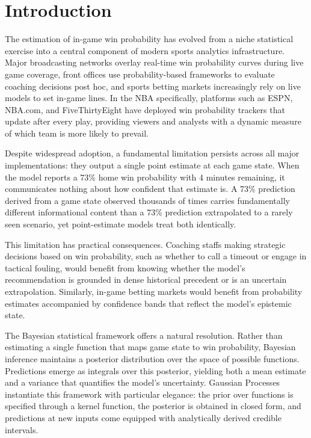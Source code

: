 \documentclass[conference]{IEEEtran}
\begin{document}
\section{Introduction}

The estimation of in-game win probability has evolved from a niche statistical exercise into a central component of modern sports analytics infrastructure. Major broadcasting networks overlay real-time win probability curves during live game coverage, front offices use probability-based frameworks to evaluate coaching decisions post hoc, and sports betting markets increasingly rely on live models to set in-game lines. In the NBA specifically, platforms such as ESPN, NBA.com, and FiveThirtyEight have deployed win probability trackers that update after every play, providing viewers and analysts with a dynamic measure of which team is more likely to prevail.

Despite widespread adoption, a fundamental limitation persists across all major implementations: they output a single point estimate at each game state. When the model reports a 73\% home win probability with 4 minutes remaining, it communicates nothing about how confident that estimate is. A 73\% prediction derived from a game state observed thousands of times carries fundamentally different informational content than a 73\% prediction extrapolated to a rarely seen scenario, yet point-estimate models treat both identically.

This limitation has practical consequences. Coaching staffs making strategic decisions based on win probability, such as whether to call a timeout or engage in tactical fouling, would benefit from knowing whether the model's recommendation is grounded in dense historical precedent or is an uncertain extrapolation. Similarly, in-game betting markets would benefit from probability estimates accompanied by confidence bands that reflect the model's epistemic state.

The Bayesian statistical framework offers a natural resolution. Rather than estimating a single function that maps game state to win probability, Bayesian inference maintains a posterior distribution over the space of possible functions. Predictions emerge as integrals over this posterior, yielding both a mean estimate and a variance that quantifies the model's uncertainty. Gaussian Processes \cite{rasmussen2006} instantiate this framework with particular elegance: the prior over functions is specified through a kernel function, the posterior is obtained in closed form, and predictions at new inputs come equipped with analytically derived credible intervals.
\end{document}
